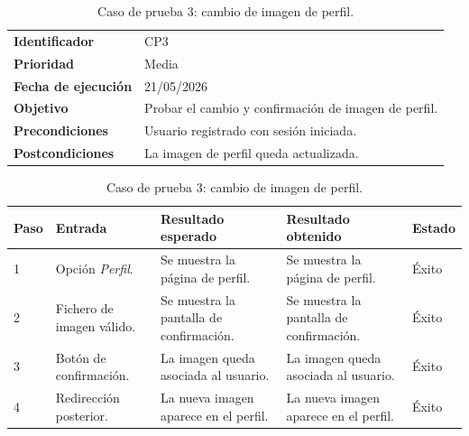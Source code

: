 \begin{table}[]
	\centering
	\footnotesize
	\renewcommand{\arraystretch}{1.2}
	\begin{tabularx}{\textwidth}{p{3.2cm} X}
		\toprule
		\textbf{Identificador} & CP3 \\
		\textbf{Prioridad} & Media \\
		\textbf{Fecha de ejecución} & 21/05/2026 \\
		\textbf{Objetivo} & Probar el cambio y confirmación de imagen de perfil. \\
		\textbf{Precondiciones} & Usuario registrado con sesión iniciada. \\
		\textbf{Postcondiciones} & La imagen de perfil queda actualizada. \\
		\midrule
	\end{tabularx}
	\begin{tabularx}{\textwidth}{p{0.8cm} p{3.2cm} X X p{1.3cm}}
		\textbf{Paso} & \textbf{Entrada} & \textbf{Resultado esperado} & \textbf{Resultado obtenido} & \textbf{Estado} \\
		\midrule
		1 & Opción \textit{Perfil}. & Se muestra la página de perfil. & Se muestra la página de perfil. & Éxito \\
		2 & Fichero de imagen válido. & Se muestra la pantalla de confirmación. & Se muestra la pantalla de confirmación. & Éxito \\
		3 & Botón de confirmación. & La imagen queda asociada al usuario. & La imagen queda asociada al usuario. & Éxito \\
		4 & Redirección posterior. & La nueva imagen aparece en el perfil. & La nueva imagen aparece en el perfil. & Éxito \\
		\bottomrule
	\end{tabularx}
	\caption{Caso de prueba 3: cambio de imagen de perfil.}
	\label{tab:cp3}
\end{table}

